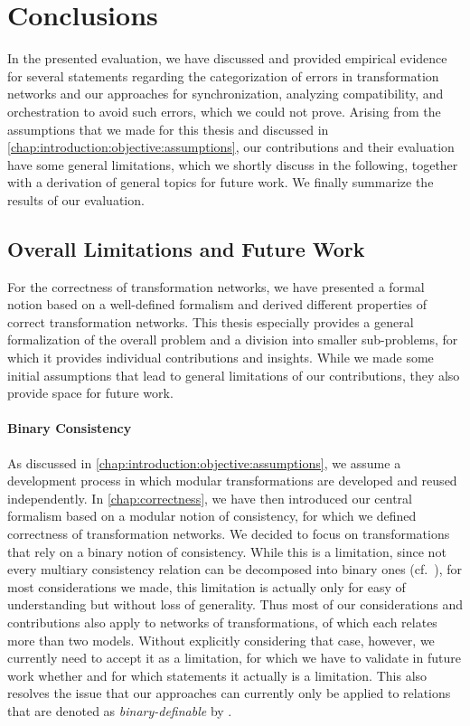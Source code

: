 \section{Conclusions}

In the presented evaluation, we have discussed and provided empirical evidence for several statements regarding the categorization of errors in transformation networks and our approaches for synchronization, analyzing compatibility, and orchestration to avoid such errors, which we could not prove.
Arising from the assumptions that we made for this thesis and discussed in \autoref{chap:introduction:objective:assumptions}, our contributions and their evaluation have some general limitations, which we shortly discuss in the following, together with a derivation of general topics for future work.
We finally summarize the results of our evaluation.


\subsection{Overall Limitations and Future Work}

For the correctness of transformation networks, we have presented a formal notion based on a well-defined formalism and derived different properties of correct transformation networks.
This thesis especially provides a general formalization of the overall problem and a division into smaller sub-problems, for which it provides individual contributions and insights.
While we made some initial assumptions that lead to general limitations of our contributions, they also provide space for future work.

\paragraph{Binary Consistency}
As discussed in \autoref{chap:introduction:objective:assumptions}, we assume a development process in which modular transformations are developed and reused independently.
In \autoref{chap:correctness}, we have then introduced our central formalism based on a modular notion of consistency, for which we defined correctness of transformation networks.
We decided to focus on transformations that rely on a binary notion of consistency.
While this is a limitation, since not every multiary consistency relation can be decomposed into binary ones (cf.~\cite{stevens2020BidirectionalTransformationLarge-SoSym}), for most considerations we made, this limitation is actually only for easy of understanding but without loss of generality.
Thus most of our considerations and contributions also apply to networks of transformations, of which each relates more than two models.
Without explicitly considering that case, however, we currently need to accept it as a limitation, for which we have to validate in future work whether and for which statements it actually is a limitation.
This also resolves the issue that our approaches can currently only be applied to relations that are denoted as \emph{binary-definable} by \textcite{stevens2020BidirectionalTransformationLarge-SoSym}.

